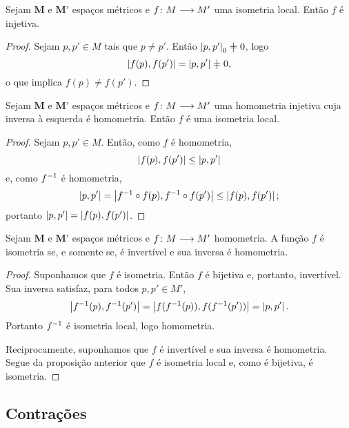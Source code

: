 \begin{proposition}
Sejam $\bm{M}$ e $\bm{M'}$ espaços métricos e ${f}\colon {M} \longrightarrow {M'}$ uma isometria local. Então $f$ é injetiva.
\end{proposition}
\begin{proof}
Sejam $p,p' \in M$ tais que $p \neq p'$. Então $\dist{p}{p'}_0 \neq 0$, logo
	\begin{equation*}
	\dist{f(p)}{f(p')} = \dist{p}{p'} \neq 0,
	\end{equation*}
o que implica $f(p) \neq f(p')$.
\end{proof}

\begin{proposition}
Sejam $\bm{M}$ e $\bm{M'}$ espaços métricos e ${f}\colon {M} \longrightarrow {M'}$ uma homometria injetiva cuja inversa à esquerda é homometria. Então $f$ é uma isometria local.
\end{proposition}
\begin{proof}
Sejam $p,p' \in M$. Então, como $f$ é homometria,
	\begin{equation*}
	\left\vert{f(p)},{f(p')}\right\vert \leq \left\vert{p},{p'}\right\vert
	\end{equation*}
e, como $f^{-1}$ é homometria,
	\begin{equation*}
	\left\vert{p},{p'}\right\vert = \left\vert{f^{-1}\circ f(p)},{f^{-1} \circ f(p')}\right\vert \leq \left\vert{f(p)},{f(p')}\right\vert;
	\end{equation*}
portanto  $\left\vert{p},{p'}\right\vert = \left\vert{f(p)},{f(p')}\right\vert$.
\end{proof}

\begin{proposition}
Sejam $\bm{M}$ e $\bm{M'}$ espaços métricos e ${f}\colon {M} \longrightarrow {M'}$ homometria. A função $f$ é isometria se, e somente se, é invertível e sua inversa é homometria.
\end{proposition}
\begin{proof}
Suponhamos que $f$ é isometria. Então $f$ é bijetiva e, portanto, invertível. Sua inversa satisfaz, para todos $p,p' \in M'$,
	\begin{equation*}
	\left\vert{f^{-1}(p)},{f^{-1}(p')}\right\vert = \left\vert{f(f^{-1}(p))},{f(f^{-1}(p'))}\right\vert = \left\vert{p},{p'}\right\vert.
	\end{equation*}
Portanto $f^{-1}$ é isometria local, logo homometria.

Reciprocamente, suponhamos que $f$ é invertível e sua inversa é homometria. Segue da proposição anterior que $f$ é isometria local e, como é bijetiva, é isometria.
\end{proof}

\subsection{Contrações}

